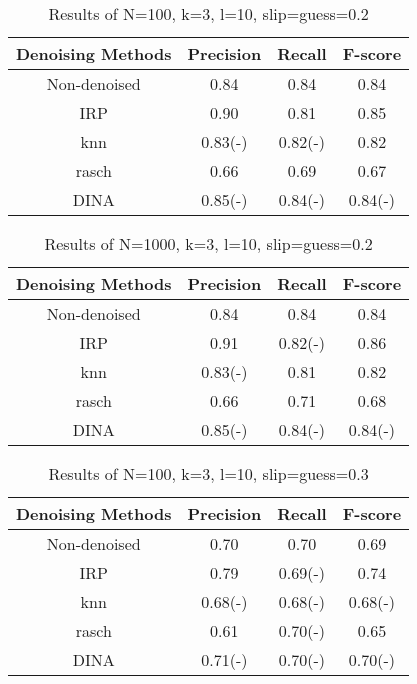 \documentclass[11pt]{article}
\begin{document}
\begin{table}[!h]
\begin{center}
\begin{tabular}{|c|c|c|c|}
\hline
Denoising Methods & Precision & Recall & F-score\\
\hline
Non-denoised & 0.84 & 0.84 & 0.84  \\
\hline
IRP & 0.90 & 0.81 & 0.85 \\
\hline
knn & 0.83(-) & 0.82(-) & 0.82 \\
\hline
rasch & 0.66 & 0.69 & 0.67 \\
\hline
DINA & 0.85(-) & 0.84(-) & 0.84(-) \\
\hline
\end{tabular}
\end{center}
\caption{Results of N=100, k=3, l=10, slip=guess=0.2}\label{tab:results3}
\end{table}


\begin{table}[!h]
\begin{center}
\begin{tabular}{|c|c|c|c|}
\hline
Denoising Methods & Precision & Recall & F-score\\
\hline
Non-denoised & 0.84 & 0.84 & 0.84  \\
\hline
IRP & 0.91 & 0.82(-) & 0.86 \\
\hline
knn & 0.83(-) & 0.81 & 0.82 \\
\hline
rasch & 0.66 & 0.71 & 0.68 \\
\hline
DINA & 0.85(-) & 0.84(-) & 0.84(-) \\
\hline
\end{tabular}
\end{center}
\caption{Results of N=1000, k=3, l=10, slip=guess=0.2}\label{tab:results4}
\end{table}


\begin{table}[!h]
\begin{center}
\begin{tabular}{|c|c|c|c|}
\hline
Denoising Methods & Precision & Recall & F-score\\
\hline
Non-denoised & 0.70 & 0.70 & 0.69  \\
\hline
IRP & 0.79 & 0.69(-) & 0.74 \\
\hline
knn & 0.68(-) & 0.68(-) & 0.68(-) \\
\hline
rasch & 0.61 & 0.70(-) & 0.65 \\
\hline
DINA & 0.71(-) & 0.70(-) & 0.70(-) \\
\hline
\end{tabular}
\end{center}
\caption{Results of N=100, k=3, l=10, slip=guess=0.3}\label{tab:results5}
\end{table}
\end{document}
